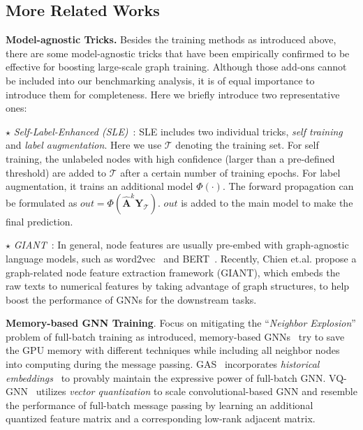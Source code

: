 \message{ !name(main.tex)}\documentclass{article}
\newcommand{\bm}[1]{\mathbf{#1}}
\begin{document}
\vspace{-2mm}
\subsection{More Related Works}
\vspace{-2mm}
\textbf{Model-agnostic Tricks.} Besides the training methods as introduced above, there are some model-agnostic tricks that have been empirically confirmed to be effective for boosting large-scale graph training. Although those add-ons cannot be included into our benchmarking analysis, it is of equal importance to introduce them for completeness. Here we briefly introduce two representative ones:

\(\star\) \textit{Self-Label-Enhanced (SLE)}~\cite{sun2021scalable}: SLE includes two individual tricks, \textit{self training} and \textit{label augmentation}. Here we use \(\mathcal{T}\) denoting the training set. For self training, the unlabeled nodes with high confidence (larger than a pre-defined threshold) are added to \(\mathcal{T}\) after a certain number of training epochs. For label augmentation, it trains an additional model \(\Phi(\cdot)\). The forward propagation can be formulated as \(out = \Phi(\hat{\bm{A}}^{k}\bm{Y}_{\mathcal{T}})\). \(out\) is added to the main model to make the final prediction.

\(\star\) \textit{GIANT}~\cite{chien2021node}: In general, node features are usually pre-embed with graph-agnostic language models, such as word2vec~\cite{mikolov2013distributed} and BERT~\cite{devlin2018bert}. Recently, Chien et.al. propose a graph-related node feature extraction framework (GIANT), which embeds the raw texts to numerical features by taking advantage of graph structures, to help boost the performance of GNNs for the downstream tasks.

\textbf{Memory-based GNN Training}. Focus on mitigating the ``\textit{Neighbor Explosion}'' problem of full-batch training as introduced, memory-based GNNs~\cite{fey2021gnnautoscale, ding2021vq} try to save the GPU memory with different techniques while including all neighbor nodes into computing during the message passing. GAS~\cite{fey2021gnnautoscale} incorporates \textit{historical embeddings}~\cite{chen2017stochastic} to provably maintain the expressive power of full-batch GNN. VQ-GNN~\cite{ding2021vq} utilizes \textit{vector quantization} to scale convolutional-based GNN and resemble the performance of full-batch message passing by learning an additional quantized feature matrix and a corresponding low-rank adjacent matrix.
\end{document}
